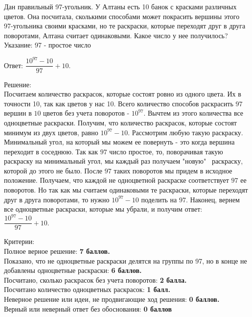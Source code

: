 \hspace{3mm}

 Дан правильный 97-угольник. У Алтаны есть 10 банок с красками различных цветов. Она посчитала, сколькими способами может покрасить вершины этого 97-угольника своими красками, но те раскраски, которые переходят друг в друга поворотами, Алтана считает одинаковыми. Какое число у нее получилось? 
Указание: 97 - простое число

\hspace{3mm}

Ответ: $\dfrac{10^{97} - 10}{97} + 10.$

Решение:\\
Посчитаем количество раскрасок, которые состоят ровно из одного цвета. Их в точности 10, так как цветов у нас 10. Всего количество способов раскрасить $97$ вершин в $10$ цветов без учета поворотов - $10^{97}$. Вычтем из этого количества все одноцветные раскраски. Получим, что количество раскрасок, которые состоят минимум из двух цветов, равно $10^{97} - 10$. Рассмотрим любую такую раскраску. Минимальный угол, на который мы можем ее повернуть - это когда вершина переходит в соседнюю. Так как $97$ число простое, то, поворачивая такую раскраску на минимальный угол, мы каждый раз получаем "новую" \ раскраску, которой до этого не было. После $97$ таких поворотов мы придем в исходное положение. Получаем, что каждой не одноцветной раскраске соответствует $97$ ее поворотов. Но так как мы считаем одинаковыми те раскраски, которые переходят друг в друга поворотами, то нужно $10^{97} - 10$ поделить на $97$. Наконец, вернем все одноцветные раскраски, которые мы убрали, и получим ответ:\\

$\dfrac{10^{97} - 10}{97} + 10.$


\newpage

\hspace{3mm}

Критерии:\\
Полное верное решение: \textbf{7 баллов.}\\
Показано, что не одноцветные раскраски делятся на группы по 97, но в конце не добавлены одноцветные раскраски: \textbf{6 баллов.}\\
Посчитано, сколько раскрасок без учета поворотов: \textbf{2 балла.}\\
Посчитано количество одноцветных раскрасок: \textbf{1 балл.}\\
Неверное решение или идеи, не продвигающие ход решения: \textbf{0 баллов.}\\
Верный или неверный ответ без обоснования: \textbf{0 баллов
}